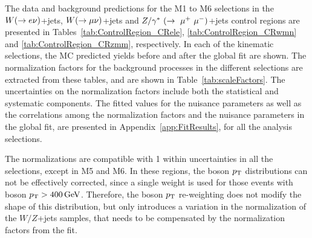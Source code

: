 The data and background predictions for the M1 to M6 selections in the $W(\rightarrow e \nu)$+jets, $W(\rightarrow \mu \nu)$+jets and $Z/\gamma^*~(\rightarrow~\mu^+~\mu^-)$+jets control regions are presented in Tables~\ref{tab:ControlRegion_CRele}, \ref{tab:ControlRegion_CRwmn} and \ref{tab:ControlRegion_CRzmm}, respectively.
In each of the kinematic selections, the MC predicted yields before and after the global fit are shown.
The normalization factors for the background processes in the different selections are extracted from these tables, and are shown in Table~\ref{tab:scaleFactors}.
The uncertainties on the normalization factors include both the statistical and systematic components.
The fitted values for the nuisance parameters as well as the correlations among the normalization factors and the nuisance parameters in the global fit, are presented in Appendix~\ref{app:FitResults}, for all the analysis selections.

The normalizations are compatible with 1 within uncertainties in all the selections, except in M5 and M6.
In these regions, the boson $p_{\mathrm{T}}$ distributions can not be effectively corrected, since a single weight is used for those events with boson $\pt>\unit[400]{GeV}$.
Therefore, the boson $p_{\mathrm{T}}$ re-weighting does not modify the shape of this distribution, but only introduces a variation in the normalization of the $W/Z$+jets samples, that needs to be compensated by the normalization factors from the fit.


